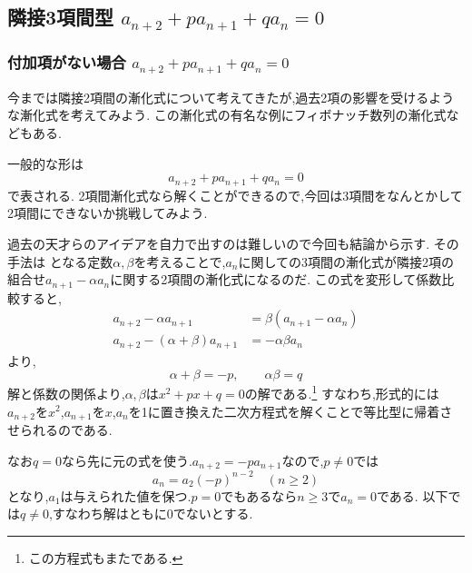 
\subsection{\texorpdfstring{隣接3項間型  $a_{n+2}+pa_{n+1}+qa_n=0$}{隣接3項間型}}\label{節：隣接3項型}
\subsubsection{\texorpdfstring{付加項がない場合  $a_{n+2}+pa_{n+1}+qa_n=0$}{付加項がない場合}}\label{節：付加項がない場合}

今までは隣接2項間の漸化式について考えてきたが,過去2項の影響を受けるような漸化式を考えてみよう.
この漸化式の有名な例にフィボナッチ数列の漸化式などもある.

一般的な形は
\[
  a_{n+2}+pa_{n+1}+qa_n=0
\]
で表される.
2項間漸化式なら解くことができるので,今回は3項間をなんとかして2項間にできないか挑戦してみよう.

過去の天才らのアイデアを自力で出すのは難しいので今回も結論から示す.
その手法は
\BookMathLayout{\[
  \begin{aligned}
    a_{n+2}+pa_{n+1}+qa_n&=0\\
    \iff a_{n+2}-\alpha a_{n+1}&=\beta(a_{n+1}-\alpha a_n)
  \end{aligned}
\]}{\[
  \begin{aligned}
    a_{n+2}+pa_{n+1}+qa_n&=0\\
    &\iff a_{n+2}-\alpha a_{n+1}\\
    &\qquad=\beta(a_{n+1}-\alpha a_n)
  \end{aligned}
\]}
となる定数$\alpha,\beta$を考えることで,$a_n$に関しての3項間の漸化式が隣接2項の組合せ$a_{n+1}-\alpha a_n$に関する2項間の漸化式になるのだ.
この式を変形して係数比較すると,
\begin{align*}
  a_{n+2}-\alpha a_{n+1}&=\beta(a_{n+1}-\alpha a_{n})\\
  a_{n+2}-(\alpha+\beta)a_{n+1}&=-\alpha\beta a_n
\end{align*}
より,
\[
  \alpha+\beta=-p,\qquad\alpha\beta=q
\]
解と係数の関係より,$\alpha,\beta$は$x^2+px+q=0$の解である.\footnote{この方程式もまたである.}
すなわち,形式的には$a_{n+2}$を$x^2$,$a_{n+1}$を$x$,$a_n$を1に置き換えた二次方程式を解くことで等比型に帰着させられるのである.

なお$q=0$なら先に元の式を使う.$a_{n+2}=-pa_{n+1}$なので,$p\ne0$では
\[
  a_n=a_2(-p)^{n-2}\quad(n\ge2)
\]
となり,$a_1$は与えられた値を保つ.$p=0$でもあるなら$n\ge3$で$a_n=0$である.
以下では$q\ne0$,すなわち解はともに0でないとする.


